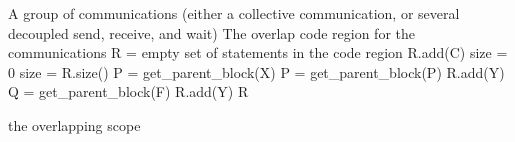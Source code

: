 \begin{algorithm}
{\scriptsize
\begin{algorithmic}[1]
\Require A group of communications (either a collective communication, or several decoupled send, receive, and wait)
\Ensure The overlap code region for the communications
\nolineno
{}
  \State {}
  \State R = empty set of statements in the code region
    \State R.add(C)
  \EndFor
  \State {}
  \State size = 0
    \State size = R.size()
      \State {}
      \State P = get\_parent\_block(X)
        \State P = get\_parent\_block(P)
      \EndWhile
        \State R.add(Y)
      \EndFor
        \State {}
          \State Q = get\_parent\_block(F)
            \State R.add(Y)
          \EndFor
        \EndFor
      \EndIf
    \EndFor
  \EndWhile
  \State \Return R
\EndFunction
\resetlineno
\end{algorithmic}
\caption{ the overlapping scope}
\label{alg:cco:region}
}%
\end{algorithm}

